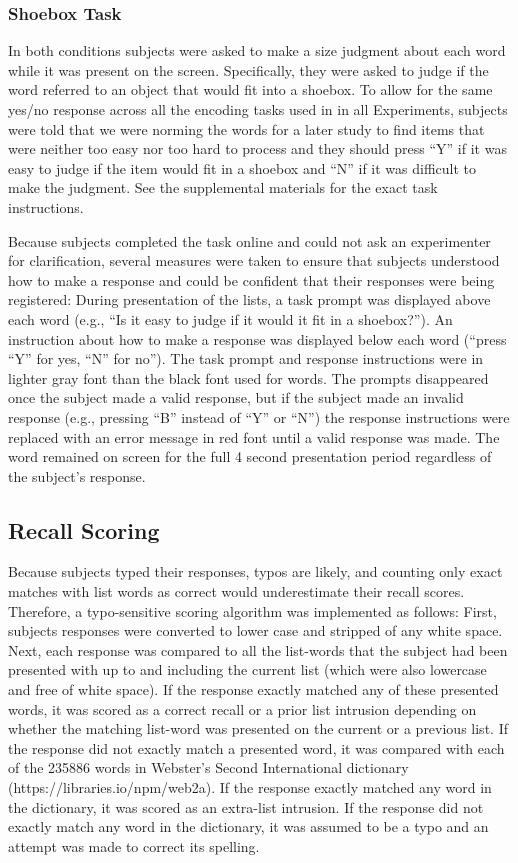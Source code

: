 \documentclass[jou,natbib]{apa6} %
\begin{document}
\subsubsection{Shoebox Task} In both conditions subjects were asked to make a size judgment about each word while it was present on the screen. Specifically, they were asked  to judge if the word referred to an object that would fit into a shoebox. To allow for the same yes/no response across all the encoding tasks used in in all Experiments, subjects were told that we were norming the words for a later study to find items that were neither too easy nor too hard to process and they should press ``Y'' if it was easy to judge if the item would fit in a shoebox and ``N'' if it was difficult to make the judgment. See the supplemental materials for the exact task instructions.

Because subjects completed the task online and could not ask an experimenter for clarification, several measures were taken to ensure that subjects understood how to make a response and could be confident that their responses were being registered: During presentation of the lists, a task prompt was displayed above each word (e.g., ``Is it easy to judge if it would it fit in a shoebox?''). An instruction about how to make a response was displayed below each word (``press ``Y'' for yes, ``N'' for no''). The task prompt and response instructions were in lighter gray font than the black font used for words. The prompts disappeared once the subject made a valid response, but if the subject made an invalid response (e.g., pressing ``B'' instead of ``Y'' or ``N'') the response instructions were replaced with an error message in red font until a valid response was made. The word remained on screen for the full 4 second presentation period regardless of the subject's response.

\subsection{Recall Scoring}
Because subjects typed their responses, typos are likely, and counting only exact matches with list words as correct would underestimate their recall scores. Therefore, a typo-sensitive scoring algorithm was implemented as follows: First, subjects responses were converted to lower case and stripped of any white space. Next, each response was compared to all the list-words that the subject had been presented with up to and including the current list (which were also lowercase and free of white space). If the response exactly matched any of these presented words, it was scored as a correct recall or a prior list intrusion depending on whether the matching list-word was presented on the current or a previous list. If the response did not exactly match a presented word, it was compared with each of the 235886 words in Webster's Second International dictionary (https://libraries.io/npm/web2a). If the response exactly matched any word in the dictionary, it was scored as an extra-list intrusion. If the response did not exactly match any word in the dictionary, it was assumed to be a typo and an attempt was made to correct its spelling.
\end{document}
